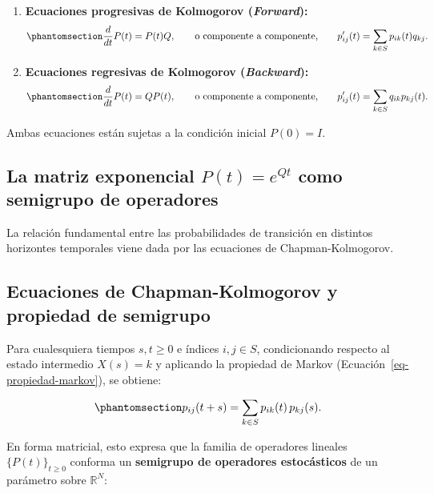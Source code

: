 \documentclass[
  spanish,
  us-letterpaper,
]{scrreprt}
\theoremstyle{definition}
\theoremstyle{remark}
\begin{document}
\begin{enumerate}
\def\labelenumi{\arabic{enumi}.}
\item
  \textbf{Ecuaciones progresivas de Kolmogorov (\emph{Forward}):}
  \begin{equation}\phantomsection\label{eq-kolmogorov-forward}{
  \frac{d}{dt} P(t) = P(t)Q, \qquad \text{o componente a componente,} \qquad p'_{ij}(t) = \sum_{k \in S} p_{ik}(t) q_{kj}.
  }\end{equation}
\item
  \textbf{Ecuaciones regresivas de Kolmogorov (\emph{Backward}):}
  \begin{equation}\phantomsection\label{eq-kolmogorov-backward}{
  \frac{d}{dt} P(t) = Q P(t), \qquad \text{o componente a componente,} \qquad p'_{ij}(t) = \sum_{k \in S} q_{ik} p_{kj}(t).
  }\end{equation}
\end{enumerate}

Ambas ecuaciones están sujetas a la condición inicial \(P(0) = I\).

\subsection{\texorpdfstring{La matriz exponencial \(P(t) = e^{Qt}\) como
semigrupo de
operadores}{La matriz exponencial P(t) = e\^{}\{Qt\} como semigrupo de operadores}}\label{la-matriz-exponencial-pt-eqt-como-semigrupo-de-operadores}

La relación fundamental entre las probabilidades de transición en
distintos horizontes temporales viene dada por las ecuaciones de
Chapman-Kolmogorov.

\label{imp-chapman-kolmogorov}
\subsection{Ecuaciones de Chapman-Kolmogorov y propiedad de
semigrupo}\label{ecuaciones-de-chapman-kolmogorov-y-propiedad-de-semigrupo}

Para cualesquiera tiempos \(s, t \ge 0\) e índices \(i, j \in S\),
condicionando respecto al estado intermedio \(X(s) = k\) y aplicando la
propiedad de Markov (Ecuación~\ref{eq-propiedad-markov}), se obtiene:

\begin{equation}\phantomsection\label{eq-chapman}{
p_{ij}(t + s) = \sum_{k \in S} p_{ik}(t)\, p_{kj}(s).
}\end{equation}

En forma matricial, esto expresa que la familia de operadores lineales
\(\{P(t)\}_{t \ge 0}\) conforma un \textbf{semigrupo de operadores
estocásticos} de un parámetro sobre \(\mathbb{R}^N\):
\end{document}

